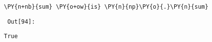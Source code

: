 {\par%
\vspace{-1\baselineskip}%
}%
\begin{notebookcell}[94]%
\begin{addmargin}[\cellleftmargin]{0em}%
{\smaller%
\par%
%
\vspace{-1\smallerfontscale}%
\begin{Verbatim}[commandchars=\\\{\}]
\PY{n+nb}{sum} \PY{o+ow}{is} \PY{n}{np}\PY{o}{.}\PY{n}{sum}
\end{Verbatim}
%
\par%
\vspace{-1\smallerfontscale}}%
\end{addmargin}
\end{notebookcell}

\par\vspace{1\smallerfontscale}%
    
        {\par%
        \vspace{-1\smallerfontscale}%
        \noindent%
        \begin{minipage}{\cellleftmargin}%
    \hfill%
    {\smaller%
    \tt%
    \color{nbframe-out-prompt}%
    Out[94]:}%
    \hspace{\inputpadding}%
    \hspace{0em}%
    \hspace{3pt}%
    \end{minipage}%
        }%
    \begin{addmargin}[\cellleftmargin]{0em}%
    {\smaller%
    \vspace{-1\smallerfontscale}%
    
    
    
    \begin{verbatim}
True
    \end{verbatim}

    
}%
    \end{addmargin}%

